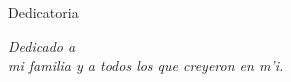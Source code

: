 \newpage\thispagestyle{plain}
\label{Dedicatoria}
\vspace*{5mm}
\centerline{{\large Dedicatoria}}
\vspace{5mm}
\begin{flushright}
\textit{
Dedicado a \\
mi familia y 
a todos los que
creyeron en m'i.
}
\end{flushright}